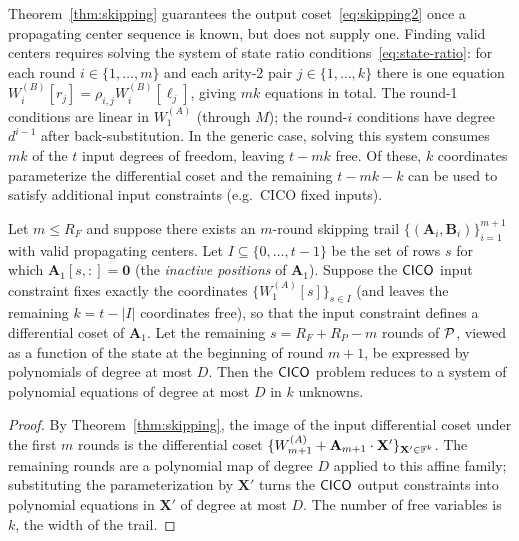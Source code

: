 \documentclass[11pt]{article}
\begin{document}
\begin{remark}
    Theorem~\ref{thm:skipping} guarantees the output coset~\eqref{eq:skipping2}
    once a propagating center sequence is known, but does not supply one.
    Finding valid centers requires solving the system of state ratio
    conditions~\eqref{eq:state-ratio}: for each round $i\in\{1,\ldots,m\}$
    and each arity-2 pair $j\in\{1,\ldots,k\}$ there is one equation
    $W_i^{(B)}[r_j]=\rho_{i,j}W_i^{(B)}[\ell_j]$, giving $mk$ equations in total.
    The round-1 conditions are linear in $W_1^{(A)}$ (through $M$);
    the round-$i$ conditions have degree $d^{i-1}$ after back-substitution.
    In the generic case, solving this system consumes $mk$ of the $t$
    input degrees of freedom, leaving $t-mk$ free.  Of these, $k$ coordinates
    parameterize the differential coset and the remaining $t-mk-k$ can be
    used to satisfy additional input constraints (e.g.\ CICO fixed inputs).
\end{remark}

\begin{corollary}\label{cor:cico}
    Let $m\leq R_F$ and suppose there exists an $m$-round skipping trail
    $\{(\mathbf{A}_i,\mathbf{B}_i)\}_{i=1}^{m+1}$ with valid propagating centers.
    Let $I\subseteq\{0,\ldots,t-1\}$ be the set of rows $s$ for which
    $\mathbf{A}_1[s,:]=\mathbf{0}$ (the \emph{inactive positions} of $\mathbf{A}_1$).
    Suppose the $\mathsf{CICO}$ input constraint fixes exactly the coordinates
    $\{W_1^{(A)}[s]\}_{s\in I}$ (and leaves the remaining $k=t-|I|$ coordinates
    free), so that the input constraint defines a differential coset of $\mathbf{A}_1$.
    Let the remaining $s = R_F + R_P - m$ rounds of $\mathcal{P}$, viewed as a function
    of the state at the beginning of round $m+1$, be expressed by polynomials
    of degree at most $D$.
    Then the $\mathsf{CICO}$ problem reduces to a system of polynomial equations of
    degree at most $D$ in $k$ unknowns.
\end{corollary}
\begin{proof}
    By Theorem~\ref{thm:skipping}, the image of the input differential coset
    under the first $m$ rounds is the differential coset
    $\{W_{m+1}^{(A)} + \mathbf{A}_{m+1}\cdot\mathbf{X}'\}_{\mathbf{X}'\in\mathbb{F}^k}$.
    The remaining rounds are a polynomial map of degree $D$ applied to this
    affine family; substituting the parameterization by $\mathbf{X}'$ turns the
    $\mathsf{CICO}$ output constraints into polynomial equations in $\mathbf{X}'$ of
    degree at most $D$.  The number of free variables is $k$, the width of the trail.
\end{proof}
\end{document}
